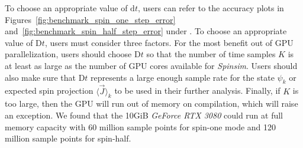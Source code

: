 \documentclass{jors}
\newcommand{\note}[1]{\textcolor{green}{\texttt{[NOTE: #1]}}}
\begin{document}
		To choose an appropriate value of $ \mathrm{d}t $, users can refer to the accuracy plots in Figures~\ref{fig:benchmark_spin_one_step_error} and~\ref{fig:benchmark_spin_half_step_error} under \emph{}. %
		To choose an appropriate value of $ \mathrm{D}t $, users must consider three factors.
		For the most benefit out of GPU parallelization, users should choose $ \mathrm{D}t $ so that the number of time samples $ K $ is at least as large as the number of GPU cores available for \emph{Spinsim}.
		Users should also make sure that $ \mathrm{D}t $ represents a large enough sample rate for the state $ \psi_k $ or expected spin projection $ \langle \overrightarrow{J}\rangle_k $ to be used in their further analysis.
		Finally, if $ K $ is too large, then the GPU will run out of memory on compilation, which will raise an exception. %
		We found that the 10GiB \emph{GeForce RTX 3080} could run at full memory capacity with 60 million sample points for spin-one mode and 120 million sample points for spin-half.

\end{document}
